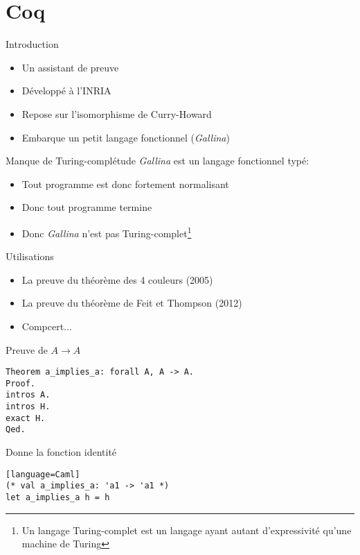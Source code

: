 \documentclass[11pt,a4paper]{beamer}
\theoremstyle{plain}
\theoremstyle{definition}
\theoremstyle{remark}
\begin{document}
\section{Coq}

\begin{frame}{Introduction}
\begin{itemize}
	\item Un assistant de preuve
	\item Développé à l'INRIA
	\item Repose sur l'isomorphisme de Curry-Howard
	\item Embarque un petit langage fonctionnel (\emph{Gallina})
\end{itemize}
\end{frame}

\begin{frame}{Manque de Turing-complétude}
\emph{Gallina} est un langage fonctionnel typé:
\begin{itemize}
	\item Tout programme est donc fortement normalisant
	\item Donc tout programme termine
	\item Donc \emph{Gallina} n'est pas Turing-complet\footnote{Un langage Turing-complet est un langage ayant autant d'expressivité qu'une machine de Turing}
\end{itemize}

\end{frame}

\begin{frame}{Utilisations}
	\begin{itemize}
		\item La preuve du théorème des 4 couleurs (2005)
		\item La preuve du théorème de Feit et Thompson (2012)
		\item Compcert...
	\end{itemize}
\end{frame}

\begin{frame}[fragile]{Preuve de $A\rightarrow A$}
\begin{lstlisting}[frame=single]
Theorem a_implies_a: forall A, A -> A.
Proof.
intros A.
intros H.
exact H.
Qed.
\end{lstlisting}

Donne la fonction identité
\begin{lstlisting}[frame=single][language=Caml]
(* val a_implies_a: 'a1 -> 'a1 *)
let a_implies_a h = h
\end{lstlisting}
\end{frame}
\end{document}
